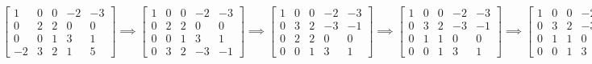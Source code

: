 \documentclass{article}
\begin{document}
$
\begin{bmatrix}
1 &0 &0 &-2 &-3\\
0 &2 &2 &0 &0\\
0 &0 &1 &3 &1\\
-2 &3 &2 &1 &5
\end{bmatrix}
\implies
\begin{bmatrix}
1 &0 &0 &-2 &-3\\
0 &2 &2 &0 &0\\
0 &0 &1 &3 &1\\
0 &3 &2 &-3 &-1
\end{bmatrix}
\implies
\begin{bmatrix}
1 &0 &0 &-2 &-3\\
0 &3 &2 &-3 &-1\\
0 &2 &2 &0 &0\\
0 &0 &1 &3 &1
\end{bmatrix}
\implies
\begin{bmatrix}
1 &0 &0 &-2 &-3\\
0 &3 &2 &-3 &-1\\
0 &1 &1 &0 &0\\
0 &0 &1 &3 &1
\end{bmatrix}
\implies
\begin{bmatrix}
1 &0 &0 &-2 &-3\\
0 &3 &2 &-3 &-1\\
0 &1 &1 &0 &0\\
0 &0 &1 &3 &1
\end{bmatrix}
\implies
\begin{bmatrix}
1 &0 &0 &-2 &-3\\
0 &3 &2 &-3 &-1\\
0 &0 &\dfrac{1}{3} &1 &\dfrac{1}{3}\\
0 &0 &1 &3 &1
\end{bmatrix}
\implies
\begin{bmatrix}
1 &0 &0 &-2 &-3\\
0 &3 &2 &-3 &-1\\
0 &0 &1 &3 &1\\
0 &0 &0 &0 &0
\end{bmatrix}
\implies
\begin{bmatrix}
1 &0 &0 &-2 &-3\\
0 &3 &0 &-9 &-3\\
0 &0 &1 &3 &1\\
0 &0 &0 &0 &0
\end{bmatrix}
\implies
\begin{bmatrix}
1 &0 &0 &-2 &-3\\
0 &1 &0 &-3 &-1\\
0 &0 &1 &3 &1\\
0 &0 &0 &0 &0
\end{bmatrix}
\implies \text{System is consistent.}
$
\end{document}
